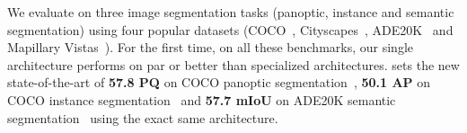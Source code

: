 We evaluate \modelname on three image segmentation tasks (panoptic, instance and semantic segmentation) using four popular datasets (COCO~\cite{lin2014coco}, Cityscapes~\cite{Cordts2016Cityscapes}, ADE20K~\cite{zhou2017ade20k} and Mapillary Vistas~\cite{neuhold2017mapillary}).
For the first time, on all these benchmarks, our single architecture performs on par or better than specialized architectures.
\modelname sets the new state-of-the-art of \textbf{57.8 PQ} on COCO panoptic segmentation~\cite{kirillov2017panoptic}, \textbf{50.1 AP} on COCO instance segmentation~\cite{lin2014coco} and \textbf{57.7 mIoU} on ADE20K semantic segmentation~\cite{zhou2017ade20k} using the exact same architecture.


















